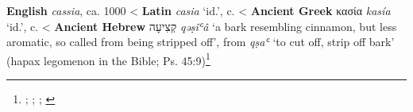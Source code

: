 \begin{etymology}\label{ety:cassia}
\textbf{English} \textit{cassia}, ca. 1000
< \textbf{Latin} \textit{casia} `id.',  c. \AD{}
< \textbf{Ancient Greek} {κασία} \textit{kasía} `id.',  c. \BC{}
< \textbf{Ancient Hebrew} {קְצִיעָה} \textit{qəṣîʿâ} `a bark resembling cinnamon, but less aromatic, so called from being stripped off', from \textit{qṣaʿ} `to cut off, strip off bark' (hapax legomenon in the Bible; Ps. 45:9)\footnote{\textcite[s.v. cassia]{oed}; \textcite{rosol_early_2018}; \textcite[653]{beekes_etymological_2010}; \textcite[589]{klein_comprehensive_1987}}
\end{etymology}